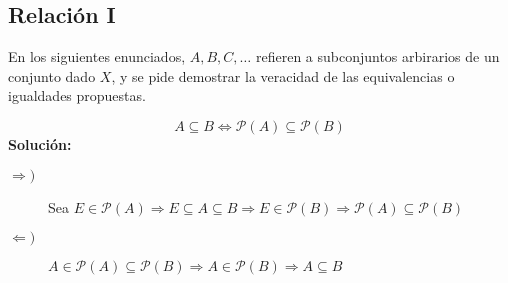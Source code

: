 \subsection{Relación I}
En los siguientes enunciados, $A, B, C, \ldots$ refieren a subconjuntos arbirarios de un conjunto dado $X$, y se pide demostrar la veracidad de las equivalencias o igualdades propuestas.

\begin{ejercicio}
    \begin{equation*}
        A \subseteq B \Longleftrightarrow \mathcal{P}(A) \subseteq \mathcal{P}(B)
    \end{equation*}
    \textbf{Solución:}
    \begin{description}
        \item [$\Longrightarrow)$] Sea $E\in \mathcal{P}(A) \Longrightarrow E\subseteq A\subseteq B \Longrightarrow E\in \mathcal{P}(B) \Longrightarrow \mathcal{P}(A)\subseteq \mathcal{P}(B)$
        \item [$\Longleftarrow)$] $A\in \mathcal{P}(A)\subseteq \mathcal{P}(B)\Longrightarrow A\in \mathcal{P}(B) \Longrightarrow A\subseteq B$
    \end{description}
\end{ejercicio}

